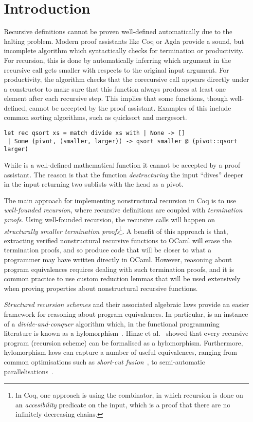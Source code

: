 \documentclass[ a4paper, UKenglish, cleveref, autoref, thm-restate]{lipics-v2021}
\begin{document}
\section{Introduction}
\label{sec:intro}
Recursive definitions cannot be proven well-defined automatically due to the
halting problem. Modern proof assistants like Coq or Agda provide a sound, but
incomplete algorithm which syntactically checks for termination or
productivity.  For recursion, this is done by automatically inferring
which argument in the recursive call gets smaller with respects to the original
input argument.  For productivity, the algorithm checks that the corecursive
call appears directly under a constructor to make sure that this function
always produces at least one element after each recursive step.
This implies that some functions, though well-defined, cannot be accepted by
the proof assistant. Examples of this include common sorting algorithms, such
as quicksort and mergesort.
\begin{verbatim}
let rec qsort xs = match divide xs with | None -> []
 | Some (pivot, (smaller, larger)) -> qsort smaller @ (pivot::qsort larger)
\end{verbatim}
While  is a well-defined mathematical function it cannot be
accepted by a proof assistant.  The reason is that the 
function \emph{destructuring} the input ``dives'' deeper in the input returning
two sublists with the head as a pivot.

The main approach for implementing nonstructural recursion in Coq is to use
\emph{well-founded recursion}, where recursive definitions are coupled with
\emph{termination proofs}.  Using well-founded recursion, the recursive calls
will happen on \emph{structurally smaller termination proofs}\footnote{In Coq,
one approach is using the  combinator, in which recursion is done on
an \emph{accesibility} predicate on the input, which is a proof that there are
no infinitely decreasing chains.}. A benefit of this approach is that,
extracting verified nonstructural recursive functions to OCaml will erase the
termination proofs, and so produce code that will be closer to what a
programmer may have written directly in OCaml. However, reasoning about program
equivalences requires dealing with such termination proofs, and it is common
practice to use custom reduction lemmas that will be used extensively when
proving properties about nonstructural recursive functions.

\emph{Structured recursion schemes} and their associated algebraic laws provide
an easier framework for reasoning about program equivalences.  In particular,
 is an instance of a \emph{divide-and-conquer}
algorithm which, in the functional programming literature is known as a
hylomorphism~\cite{MeijerFP91, HuIT96}.  Hinze et al.~\cite{HinzeWG15} showed
that every recursive program (recursion scheme) can be formalised as a hylomorphism.
Furthermore, hylomorphism laws can capture a number of useful equivalences,
ranging from common optimisations such as \emph{short-cut
fusion}~\cite{TakanoM95}, to semi-automatic
parallelisations~\cite{Gibbons96:Third, farmsCastro}.
\end{document}
